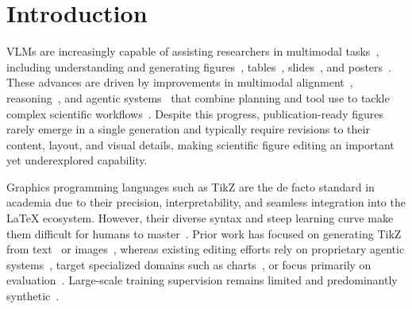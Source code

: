 \section{Introduction}
\label{sec:Introduction}

VLMs are increasingly capable of assisting researchers in multimodal tasks~\citep{eger2026transformingsciencelargelanguage}, including understanding and generating figures~\citep{li-etal-2024-multimodal-arxiv, NEURIPS2024_CharXiv}, tables~\citep{NEURIPS_SciGen}, slides~\citep{Ge_2025_CVPR_AutoPresent}, and posters~\citep{NEURIPS2025_Paper2Poster}. These advances are driven by improvements in multimodal alignment~\citep{NEURIPS2023_VisualInstructionTuning}, reasoning~\citep{zhang2024multimodalchainofthoughtreasoninglanguage, huang2026visionr1incentivizingreasoningcapability}, and agentic systems~\citep{koh-etal-2024-visualwebarena} that combine planning and tool use to tackle complex scientific workflows~\citep{sun2026scienceboardevaluatingmultimodalautonomous}. Despite this progress, publication-ready figures rarely emerge in a single generation and typically require revisions to their content, layout, and visual details, making scientific figure editing an important yet underexplored capability.

Graphics programming languages such as TikZ are the de facto standard in academia due to their precision, interpretability, and seamless integration into the \LaTeX{} ecosystem. However, their diverse syntax and steep learning curve make them difficult for humans to master~\citep{belouadi2024automatikz}. Prior work has focused on generating TikZ from text~\citep{greisinger2026tikzilla} or images~\citep{belouadi2024detikzify}, whereas existing editing efforts rely on proprietary agentic systems~\citep{lin2026autofigureeditgeneratingeditablescientific}, target specialized domains such as charts~\citep{zhao-etal-2025-chartedit}, or focus primarily on evaluation~\citep{rahman2026viseditbenchvisionlanguagemodelsedit,bo2026diagrammmumultimodalbenchmarkscientific}. Large-scale training supervision remains limited and predominantly synthetic~\citep{wang2026disciplinegen1mlargescaledatasetmultidisciplinary,bo2026diagrammmumultimodalbenchmarkscientific}.

